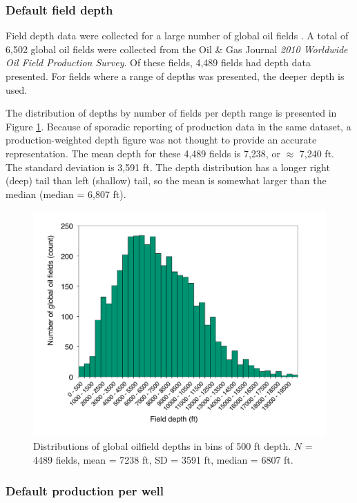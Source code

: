 \documentclass[11pt]{report}
\newcommand{\marg}[1]{{\footnotesize\textit{\textcolor{stanford}{'#1'}}}}
\newcommand{\marginnote}[1]{\marginpar{\marg{#1}}}
\begin{document}
\subsubsection{Default field depth}

Field depth data were collected for a large number of global oil fields \cite{OGJ2009a}. A total of 6,502 global oil fields were collected from the Oil \& Gas Journal \emph{2010 Worldwide Oil Field Production Survey}. Of these fields, 4,489 fields had depth data presented. For fields where a range of depths was presented, the deeper depth is used.

The distribution of depths by number of fields per depth range is presented in Figure \ref{fig:depth_distribution}. Because of sporadic reporting of production data in the same dataset, a production-weighted depth figure was not thought to provide an accurate representation. \marginnote{Active Field 2.2.4}The mean depth for these 4,489 fields is 7,238, or $\approx$ 7,240 ft. The standard deviation is 3,591 ft. The depth distribution has a longer right (deep) tail than left (shallow) tail, so the mean is somewhat larger than the median (median = 6,807 ft).

\begin{figure}[t]
\includegraphics[width=0.8\columnwidth]{images/depth_distribution.pdf}
\caption{Distributions of global oilfield depths in bins of 500 ft depth. $N$ = 4489 fields, mean = 7238 ft, SD = 3591 ft, median = 6807 ft.}
\label{fig:depth_distribution}
\end{figure}



\subsubsection{Default production per well} \label{sec:well_production}
\end{document}
